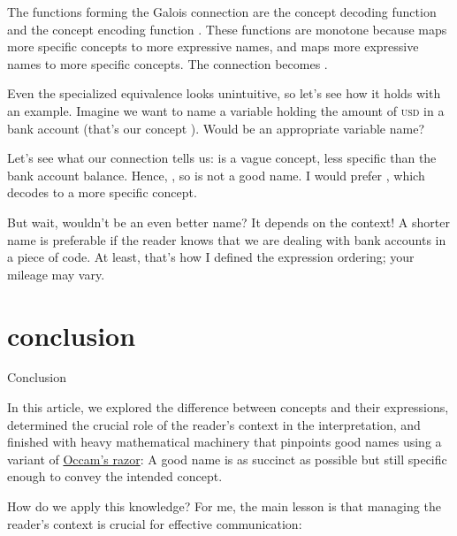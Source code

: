 \documentclass{article}
\begin{document}
The functions forming the Galois connection are the concept decoding function
and the concept encoding function
.
These functions are monotone because  maps more specific concepts to more expressive names,
and  maps more expressive names to more specific concepts.
The connection becomes
.

Even the specialized equivalence looks unintuitive,
so let's see how it holds with an example.
Imagine we want to name a variable holding the amount of \textsc{usd} in a bank account
(that's our concept ).
Would  be an appropriate variable name?

Let's see what our connection tells us:
is a vague concept,
less specific than the bank account balance.
Hence,
,
so  is not a good name.
I would prefer , which decodes to a more specific concept.

But wait, wouldn't  be an even better name?
It depends on the context!
A shorter name is preferable if the reader knows that we are dealing with bank accounts in a piece of code.
At least, that's how I defined the expression ordering; your mileage may vary.

\section{conclusion}{Conclusion}

In this article, we explored the difference between concepts and their expressions,
determined the crucial role of the reader's context in the interpretation,
and finished with heavy mathematical machinery that pinpoints good names using a variant of \href{https://en.wikipedia.org/wiki/Occam's_razor}{Occam's razor}:
A good name is as succinct as possible but still specific enough to convey the intended concept.

How do we apply this knowledge?
For me, the main lesson is that managing the reader's context is crucial for effective communication:
\end{document}
